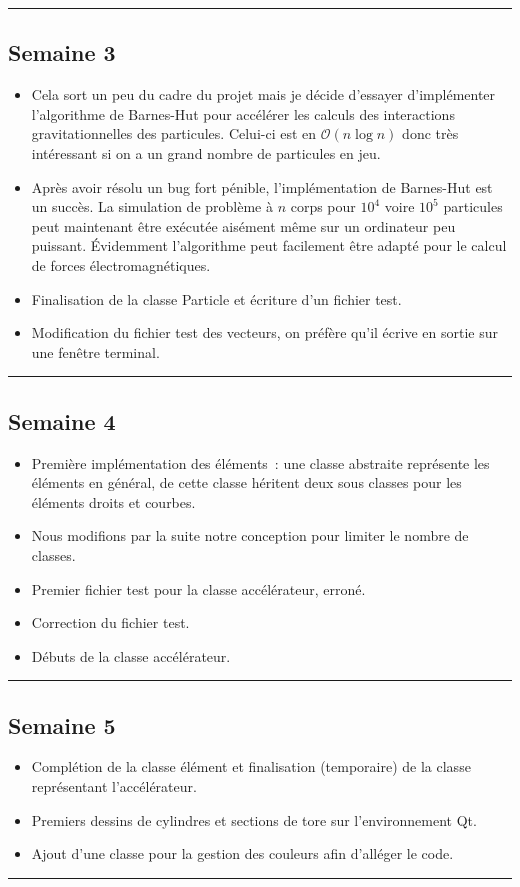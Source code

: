 \documentclass[12pt, letterpaper, twoside]{article}
\begin{document}
\rule{\textwidth}{0.4pt}

\subsection*{Semaine 3}
\begin{itemize}
\item Cela sort un peu du cadre du projet mais je décide d'essayer d'implémenter l'algorithme de Barnes-Hut pour accélérer les calculs des interactions gravitationnelles des particules. Celui-ci est en  $\mathcal{O}(n\log{n})$ donc très intéressant si on a un grand nombre de particules en jeu.

\item Après avoir résolu un bug fort pénible, l'implémentation de Barnes-Hut est un succès. La simulation de problème à $n$ corps pour $10^4$ voire $10^5$ particules peut maintenant être exécutée aisément même sur un ordinateur peu puissant. Évidemment l'algorithme peut facilement être adapté pour le calcul de forces électromagnétiques.

\item Finalisation de la classe Particle et écriture d'un fichier test.
\item Modification du fichier test des vecteurs, on préfère qu'il écrive en sortie sur une fenêtre terminal.
\end{itemize}

\rule{\textwidth}{0.4pt}

\subsection*{Semaine 4}

\begin{itemize}
\item Première implémentation des éléments : une classe abstraite représente les éléments en général, de cette classe héritent deux sous classes pour les éléments droits et courbes.
\item Nous modifions par la suite notre conception pour limiter le nombre de classes.
\item Premier fichier test pour la classe accélérateur, erroné.
\item Correction du fichier test.
\item Débuts de la classe accélérateur.
\end{itemize}

\rule{\textwidth}{0.4pt}

\subsection*{Semaine 5}
\begin{itemize}
\item Complétion de la classe élément et finalisation (temporaire) de la classe représentant l'accélérateur.
\item Premiers dessins de cylindres et sections de tore sur l’environnement Qt.
\item Ajout d’une classe pour la gestion des couleurs afin d’alléger le code.
\end{itemize}
\rule{\textwidth}{0.4pt}
\end{document}
